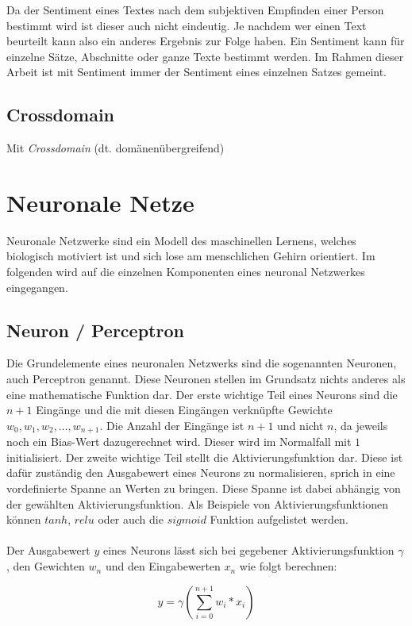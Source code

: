 Da der Sentiment eines Textes nach dem subjektiven Empfinden einer Person bestimmt wird ist dieser auch nicht eindeutig. Je nachdem wer einen Text beurteilt kann also ein anderes Ergebnis zur Folge haben. Ein Sentiment kann für einzelne Sätze, Abschnitte oder ganze Texte bestimmt werden. Im Rahmen dieser Arbeit ist mit Sentiment immer der Sentiment eines einzelnen Satzes gemeint.

\subsection{Crossdomain}
Mit \emph{Crossdomain} (dt. domänenübergreifend) 
\section{Neuronale Netze}
\label{basics:neural_network}
Neuronale Netzwerke sind ein Modell des maschinellen Lernens, welches biologisch motiviert ist und sich lose am menschlichen Gehirn orientiert. Im folgenden wird auf die einzelnen Komponenten eines neuronal Netzwerkes eingegangen.
\subsection{Neuron / Perceptron}
\label{basic:neural_network:neuron}
Die Grundelemente eines neuronalen Netzwerks sind die sogenannten Neuronen, auch Perceptron genannt. Diese Neuronen stellen im Grundsatz nichts anderes als eine mathematische Funktion dar. Der erste wichtige Teil eines Neurons sind die $n + 1$ Eingänge und die mit diesen Eingängen verknüpfte Gewichte ${w_0, w_1, w_2, ..., w_{n+1}}$. Die Anzahl der Eingänge ist $n+1$ und nicht $n$, da jeweils noch ein Bias-Wert dazugerechnet wird. Dieser wird im Normalfall mit $1$ initialisiert. Der zweite wichtige Teil stellt die Aktivierungsfunktion dar. Diese ist dafür zuständig den Ausgabewert eines Neurons zu normalisieren, sprich in eine vordefinierte Spanne an Werten zu bringen. Diese Spanne ist dabei abhängig von der gewählten Aktivierungsfunktion. Als Beispiele von Aktivierungsfunktionen können $tanh$, $relu$ oder auch die $sigmoid$ Funktion aufgelistet werden.\\\\
Der Ausgabewert $y$ eines Neurons lässt sich bei gegebener Aktivierungsfunktion $\gamma$, den Gewichten $w_n$ und den Eingabewerten $x_n$ wie folgt berechnen:

\begin{equation}
y = \gamma(\sum_{i=0}^{n+1} w_i*x_i)
\end{equation}

